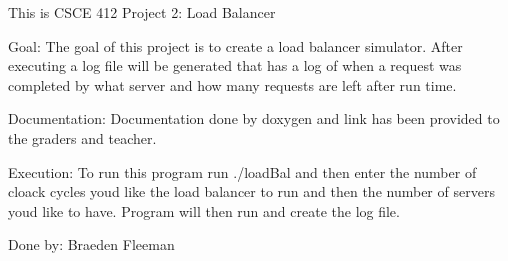 This is C\+S\+CE 412 Project 2\+: Load Balancer

Goal\+: The goal of this project is to create a load balancer simulator. After executing a log file will be generated that has a log of when a request was completed by what server and how many requests are left after run time.

Documentation\+: Documentation done by doxygen and link has been provided to the graders and teacher.

Execution\+: To run this program run ./load\+Bal and then enter the number of cloack cycles you\textquotesingle{}d like the load balancer to run and then the number of servers you\textquotesingle{}d like to have. Program will then run and create the log file.

Done by\+: Braeden Fleeman 